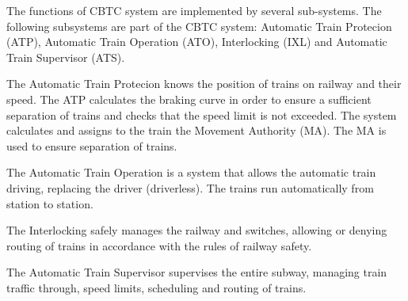 \documentclass{ewic}
\begin{document}
			
			The functions of CBTC system are implemented by several sub-systems. The following subsystems are part of the CBTC system: Automatic Train Protecion (ATP), Automatic Train Operation (ATO), Interlocking (IXL) and Automatic Train Supervisor (ATS).
			
			 
			The Automatic Train Protecion knows the position of trains on railway and their speed. The ATP calculates the braking curve in order to ensure a sufficient separation of trains and checks that the speed limit is not exceeded. The system calculates and assigns to the train the Movement Authority (MA). %
			The MA is used to ensure separation of trains.
			 
			 
			The Automatic Train Operation is a system that allows the automatic train driving, replacing the driver (driverless). The trains run automatically from station to station.
			 
			
			The Interlocking safely manages the railway and switches, allowing or denying routing of trains in accordance with the rules of railway safety.
			
			The Automatic Train Supervisor supervises the entire subway, managing train traffic through, speed limits, scheduling and routing of trains.
			
\end{document}
